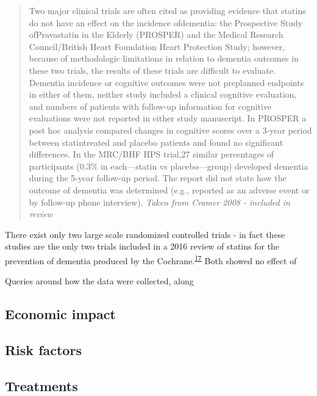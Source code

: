 \documentclass[a4paper, twoside]{templates/ociamthesis}
\begin{document}
\begin{quote}
Two major clinical trials are often cited as providing evidence that statins do not have an effect on the incidence ofdementia: the Prospective Study ofPravastatin in the Elderly (PROSPER) and the Medical Research
Council/British Heart Foundation Heart Protection Study; however, because of methodologic limitations in relation to dementia outcomes in these two trials, the results of these trials are difficult to evaluate. Dementia incidence or cognitive outcomes were not preplanned endpoints in either of them, neither study included a clinical cognitive evaluation, and numbers of patients with follow-up information for cognitive evaluations were not reported in either study manuscript. In PROSPER a post hoc analysis compared changes in cognitive scores over a 3-year period between statintreated and placebo patients and found no significant differences. In the MRC/BHF HPS trial,27
similar percentages of participants (0.3\% in each---statin vs placebo---group) developed dementia during the 5-year follow-up period. The report did not state how the outcome of dementia was determined (e.g., reported as an adverse event or by follow-up phone interview).
\emph{Taken from Cramer 2008 - included in review}
\end{quote}

There exist only two large scale randomized controlled trials - in fact these studies are the only two trials included in a 2016 review of statins for the prevention of dementia produced by the Cochrane.\textsuperscript{\protect\hyperlink{ref-mcguinness2016b}{17}} Both showed no effect of

Queries around how the data were collected, along

\hypertarget{economic-impact}{%
\subsection{Economic impact}\label{economic-impact}}

\hypertarget{risk-factors}{%
\subsection{Risk factors}\label{risk-factors}}

\hypertarget{treatments}{%
\subsection{Treatments}\label{treatments}}
\end{document}
